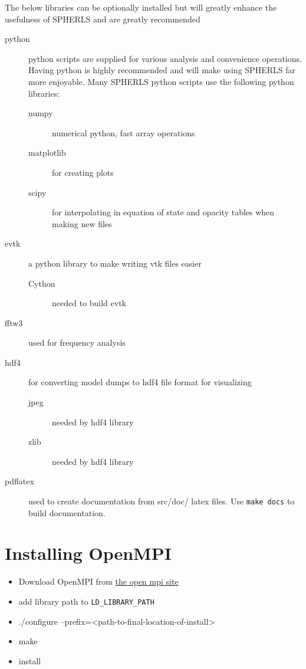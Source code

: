 \documentclass[12pt,a4paper]{book}
\begin{document}
The below libraries can be optionally installed but will greatly enhance the usefulness of SPHERLS and are greatly recommended
\begin{description}
\item[python] python scripts are supplied for various analysis and convenience operations. Having python is highly recommended and will make using SPHERLS far more enjoyable. Many SPHERLS python scripts use the following python libraries:
\begin{description}
  \item[numpy] numerical python, fast array operations
  \item[matplotlib] for creating plots
  \item[scipy] for interpolating in equation of state and opacity tables when making new files
\end{description}
\item[evtk] a python library to make writing vtk files easier
\begin{description}
\item[Cython] needed to build evtk
\end{description}
\item[fftw3] used for frequency analysis
\item[hdf4] for converting model dumps to hdf4 file format for visualizing
\begin{description}
  \item[jpeg] needed by hdf4 library
  \item[zlib] needed by hdf4 library
\end{description}
\item[pdflatex] used to create documentation from src/doc/ latex files. Use {\tt make docs} to build documentation.
\end{description}

\section{Installing OpenMPI}
\begin{itemize}
\item Download OpenMPI from \href{http://www.open-mpi.org/software/ompi/v1.6/}{the open mpi site}
\item add library path to {\tt LD\_LIBRARY\_PATH}
\item ./configure --prefix=<path-to-final-location-of-install>
\item make
\item install
\end{itemize}
\end{document}
